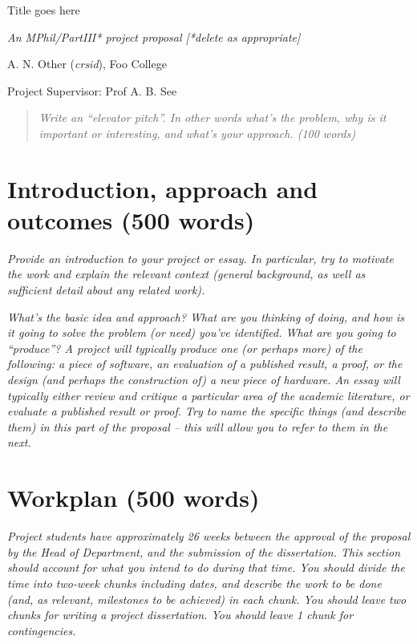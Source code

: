 \documentclass[11pt]{article}
\begin{document}
\centerline{\Large Title goes here}
\vspace{2em}
\centerline{\Large \emph{An MPhil/PartIII* project proposal [*delete as appropriate]}}
\vspace{2em}
\centerline{\large A. N. Other (\emph{crsid}), Foo College}
\vspace{1em}
\centerline{\large Project Supervisor: Prof A. B. See}
\vspace{1em}

\begin{abstract}
\textsl{Write an ``elevator pitch''. In other words what's the
  problem, why is it important or interesting, and what's your approach. (100 words)} 
\end{abstract}

\section{Introduction, approach and outcomes (500 words)}

\textsl{Provide an introduction to your project or essay. In particular, try to
  motivate the work and explain the relevant context (general
  background, as well as sufficient detail about any related
  work).}

\textsl{What's the basic idea and approach? What are you thinking of 
doing, and how is it going to solve the problem (or need) you've 
identified. What are you going to ``produce''? 
A project will typically produce one (or perhaps more) of the following:
a piece of software, an evaluation of a published result, a proof, or
the design (and perhaps the construction of) a new piece of hardware. An
essay will typically either review and critique a particular area of the
academic literature, or evaluate a published result or proof. Try to 
name the specific things (and describe them) in this part of the 
proposal -- this will allow you to refer to them in the next.} 

\section{Workplan (500 words)}
\textsl{Project students have approximately 26 weeks between the approval of 
the proposal by the Head of Department, and the submission of the dissertation. This section
should account for what you intend to do during that time. You should divide the time into two-week chunks including dates, and 
describe the work to be done (and, as relevant, milestones to be 
achieved) in each chunk. You should leave two 
chunks for writing a project dissertation. You should leave 1 chunk for contingencies.} 

\newpage
\appendix
\end{document}
